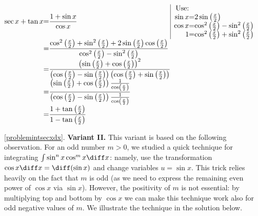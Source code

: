 {$\begin{array}{@{}r@{}c@{}l@{}l@{}|l}
\displaystyle \sec x+\tan x &=&\displaystyle  \frac{1+\sin x}{\cos x}&&\begin{array}{@{}r@{}c@{}l}\text{Use:}\\
\sin x &=& 2\sin \left(\frac{x}{2}\right)\\ \cos x&=& \cos^2 \left(\frac{x}{2}\right) -\sin^2 \left(\frac{x}{2}\right)\\ 1&=&\cos^2 \left(\frac{x}{2}\right)+ \sin^2 \left(\frac{x}{2}\right) \end{array}\\
&=&\displaystyle  \frac{\cos^2\left(\frac{x}{2}\right)+ \sin^2\left(\frac{x}{2}\right)+2\sin \left(\frac{x}{2}\right) \cos \left(\frac{x}{2}\right)}{\cos^2 \left(\frac{x}{2}\right) -\sin^2\left(\frac{x}{2}\right)}\\
&=&\displaystyle \frac{\left(\sin \left(\frac{x}{2}\right)+ \cos\left( \frac{ x}{ 2}\right) \right)^{2}}{ {\left(\cos \left( \frac{ x}{ 2} \right)-\sin \left( \frac{x }{2}\right)\right)} \left(\cos  \left(\frac{x}{2}\right)+\sin \left(\frac{x}{2}\right)\right)}\\
&=&\displaystyle \frac{\left(\sin \left(\frac{x}{2}\right)+ \cos\left( \frac{ x}{ 2}\right) \right)\frac{1}{\cos  \left(\frac{x}{2}\right) } }{ \left(\cos  \left(\frac{x}{2}\right)- \sin \left( \frac{ x}{2} \right)\right)\frac{1}{\cos\left(\frac{x}{2}\right)}}\\
&=&\displaystyle \frac{1+\tan \left(\frac{x}{2} \right)}{1 -\tan\left( \frac{ x}{2} \right)}
\end{array}
$

\ref{problemintsecxdx}. \textbf{Variant II.} This variant is based on the following observation. For an odd number $m>0 $, we studied a quick technique for integrating $\int \sin^n x \cos^m x \diff x $: namely, use the transformation $\cos x \diff x = \diff (\sin x)$ and change variables $u=\sin x $. This trick relies heavily on the fact that $m$ is odd (as we need to express the remaining even power of $\cos x$ via $\sin x$). However, the positivity of $m$ is not essential: by multiplying top and bottom by $\cos x$ we can make this technique work also for odd negative values of $m$. We illustrate the technique in the solution below.

}
